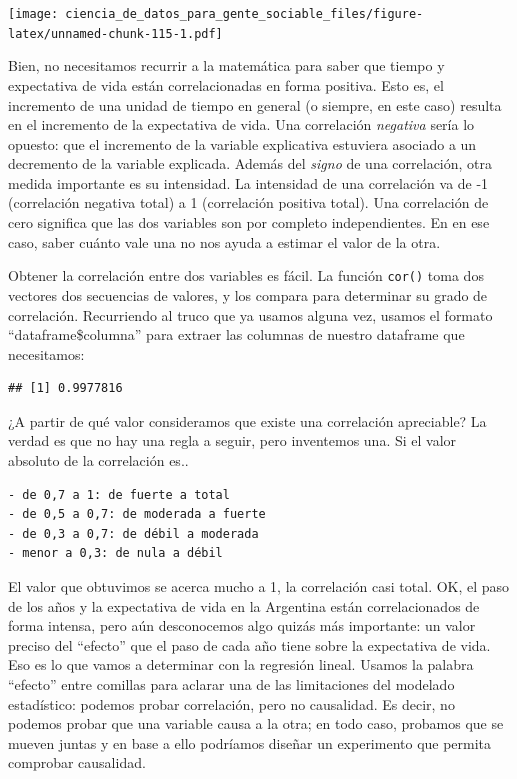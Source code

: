 \documentclass[spanish,]{book}
\newenvironment{Shaded}{\begin{snugshade}}{\end{snugshade}}
\newcommand{\KeywordTok}[1]{\textcolor[rgb]{0.13,0.29,0.53}{\textbf{#1}}}
\newcommand{\NormalTok}[1]{#1}
\newcommand{\OperatorTok}[1]{\textcolor[rgb]{0.81,0.36,0.00}{\textbf{#1}}}
\begin{document}
\texttt{[image: ciencia\_de\_datos\_para\_gente\_sociable\_files/figure-latex/unnamed-chunk-115-1.pdf]}

Bien, no necesitamos recurrir a la matemática para saber que tiempo y expectativa de vida están correlacionadas en forma positiva. Esto es, el incremento de una unidad de tiempo en general (o siempre, en este caso) resulta en el incremento de la expectativa de vida. Una correlación \emph{negativa} sería lo opuesto: que el incremento de la variable explicativa estuviera asociado a un decremento de la variable explicada. Además del \emph{signo} de una correlación, otra medida importante es su intensidad. La intensidad de una correlación va de -1 (correlación negativa total) a 1 (correlación positiva total). Una correlación de cero significa que las dos variables son por completo independientes. En en ese caso, saber cuánto vale una no nos ayuda a estimar el valor de la otra.

Obtener la correlación entre dos variables es fácil. La función \texttt{cor()} toma dos vectores dos secuencias de valores, y los compara para determinar su grado de correlación. Recurriendo al truco que ya usamos alguna vez, usamos el formato ``dataframe\$columna'' para extraer las columnas de nuestro dataframe que necesitamos:

\begin{Shaded}
\end{Shaded}

\begin{verbatim}
## [1] 0.9977816
\end{verbatim}

¿A partir de qué valor consideramos que existe una correlación apreciable? La verdad es que no hay una regla a seguir, pero inventemos una. Si el valor absoluto de la correlación es..

\begin{verbatim}
- de 0,7 a 1: de fuerte a total
- de 0,5 a 0,7: de moderada a fuerte
- de 0,3 a 0,7: de débil a moderada
- menor a 0,3: de nula a débil
\end{verbatim}

El valor que obtuvimos se acerca mucho a 1, la correlación casi total. OK, el paso de los años y la expectativa de vida en la Argentina están correlacionados de forma intensa, pero aún desconocemos algo quizás más importante: un valor preciso del ``efecto'' que el paso de cada año tiene sobre la expectativa de vida. Eso es lo que vamos a determinar con la regresión lineal. Usamos la palabra ``efecto'' entre comillas para aclarar una de las limitaciones del modelado estadístico: podemos probar correlación, pero no causalidad. Es decir, no podemos probar que una variable causa a la otra; en todo caso, probamos que se mueven juntas y en base a ello podríamos diseñar un experimento que permita comprobar causalidad.
\end{document}
